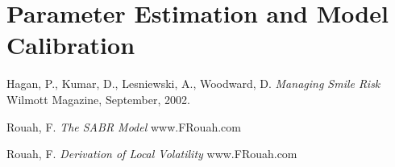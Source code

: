 \documentclass{article}
\begin{document}
\section{Parameter Estimation and Model Calibration}



\begin{thebibliography}{9}
    Hagan, P., Kumar, D., Lesniewski, A., Woodward, D.
    \textit{Managing Smile Risk}
    Wilmott Magazine, September, 2002.
    
    Rouah, F.
    \textit{The SABR Model}
    www.FRouah.com
    
    Rouah, F.
    \textit{Derivation of Local Volatility}
    www.FRouah.com
\end{thebibliography}
\end{document}
